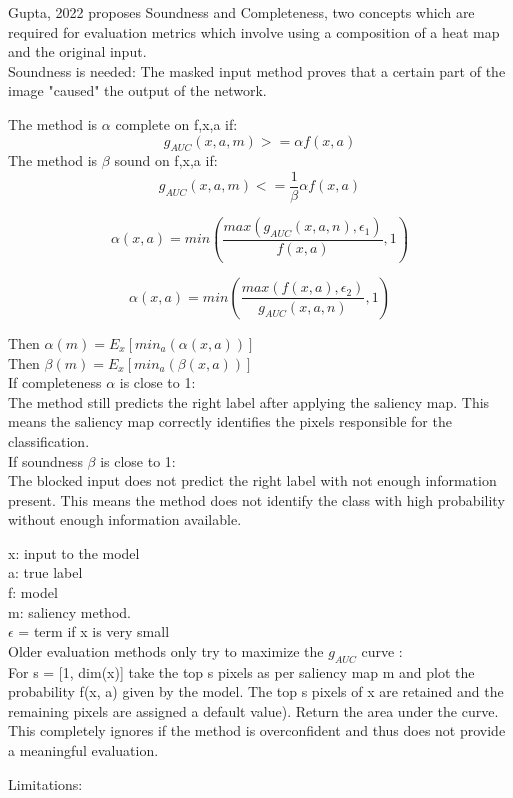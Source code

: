Gupta, 2022 \cite{gupta2022new} proposes Soundness and Completeness, two concepts which are required for evaluation metrics which involve using a composition of a heat map and the original input.\\
Soundness is needed: The masked input method proves that a certain part of the image "caused" the output of the network.

The method is $\alpha$ complete on f,x,a if:
$$ g_{AUC} (x,a,m) >= \alpha f(x,a)$$
The method is $\beta$ sound on f,x,a if:
$$ g_{AUC} (x,a,m) <= \frac{1}{\beta}\alpha f(x,a)$$

$$\alpha(x,a) = min(\frac{max(g_{AUC}(x,a,n),\epsilon_1)}{f(x,a)},1)$$

$$\alpha(x,a)=min(\frac{max(f(x,a),\epsilon_2)}{g_{AUC}(x,a,n)},1)$$

Then $\alpha(m) = E_x[min_a(\alpha(x,a))]$\\
Then $\beta(m) = E_x[min_a(\beta(x,a))]$\\
If completeness $\alpha$ is close to 1:\\ The method still predicts the right label after applying the saliency map. This means the saliency map correctly identifies the pixels responsible for the classification.\\
If soundness $\beta$ is close to 1:\\ The blocked input does not predict the right label with not enough information present. This means the method does not identify the class with high probability without enough information available.

x: input to the model \\
a: true label \\
f: model\\
m: saliency method.\\
$\epsilon$ = term if x is very small\\


Older evaluation methods only try to maximize the $g_{AUC}$ curve \cite{petsiuk2018rise}:\\
For s = [1, dim(x)] take the top s pixels as per saliency map m and plot the probability f(x, a) given by the model. The top s pixels of x are retained and the remaining pixels are assigned a default value). Return the area under the curve.\\

This completely ignores if the method is overconfident and thus does not provide a meaningful evaluation.

Limitations:\\

